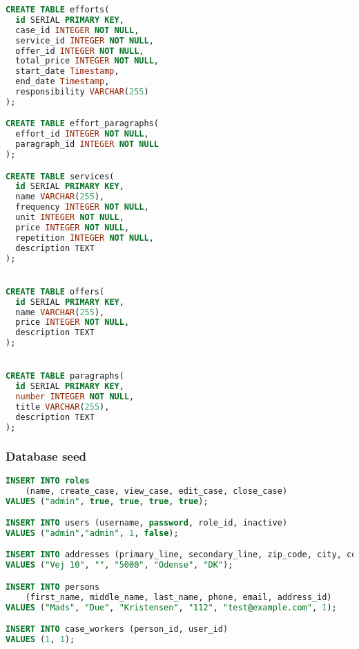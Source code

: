 \documentclass[../main.tex]{subfiles}
\begin{document}
\begin{lstlisting}[language=sql, caption=structure.sql, captionpos=b, label=structure.sql]
CREATE TABLE efforts(
  id SERIAL PRIMARY KEY,
  case_id INTEGER NOT NULL,
  service_id INTEGER NOT NULL,
  offer_id INTEGER NOT NULL,
  total_price INTEGER NOT NULL,
  start_date Timestamp,
  end_date Timestamp,
  responsibility VARCHAR(255)
);

CREATE TABLE effort_paragraphs(
  effort_id INTEGER NOT NULL,
  paragraph_id INTEGER NOT NULL
);

CREATE TABLE services(
  id SERIAL PRIMARY KEY,
  name VARCHAR(255),
  frequency INTEGER NOT NULL,
  unit INTEGER NOT NULL,
  price INTEGER NOT NULL,
  repetition INTEGER NOT NULL,
  description TEXT
);


CREATE TABLE offers(
  id SERIAL PRIMARY KEY,
  name VARCHAR(255),
  price INTEGER NOT NULL,
  description TEXT
);


CREATE TABLE paragraphs(
  id SERIAL PRIMARY KEY,
  number INTEGER NOT NULL,
  title VARCHAR(255),
  description TEXT
);

\end{lstlisting}

\pagebreak{}

\tocless\subsubsection{Database seed}

\begin{lstlisting}[language=sql, caption=seed.sql, captionpos=b, label=seed.sql]
INSERT INTO roles 
	(name, create_case, view_case, edit_case, close_case)
VALUES ("admin", true, true, true, true);

INSERT INTO users (username, password, role_id, inactive)
VALUES ("admin","admin", 1, false);

INSERT INTO addresses (primary_line, secondary_line, zip_code, city, country)
VALUES ("Vej 10", "", "5000", "Odense", "DK");

INSERT INTO persons 
	(first_name, middle_name, last_name, phone, email, address_id)
VALUES ("Mads", "Due", "Kristensen", "112", "test@example.com", 1);

INSERT INTO case_workers (person_id, user_id)
VALUES (1, 1);
\end{lstlisting}

\pagebreak{}
\end{document}
